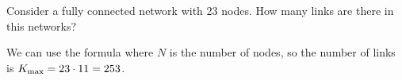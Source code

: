Consider a fully connected network with 23 nodes. How many links are there in this networks?


\solution
We can use the formula
where $N$ is the number of nodes, so the number of links is $K_{\rm max}=23\cdot 11 = 253$.
